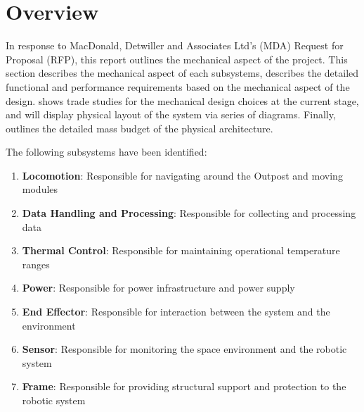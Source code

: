 \documentclass[12pt, letterpaper]{article}
\begin{document}
\cfoot{\normalsize\thepage}
\onehalfspacing
\newpage

\newpage

\newpage

\tableofcontents

\newpage
\listoffigures
\listoftables

\clearpage
\cfoot{\normalsize\thepage}
\section{Overview}
\label{sect:intro}
In response to MacDonald, Detwiller and Associates Ltd's (MDA) Request for Proposal (RFP), this report outlines the mechanical aspect of the project. This section describes the mechanical aspect of each subsystems,  describes the detailed functional and performance requirements based on the mechanical aspect of the design.  shows trade studies for the mechanical design choices at the current stage, and  will display physical layout of the system via series of diagrams. Finally,  outlines the detailed mass budget of the physical architecture.

The following subsystems have been identified:
\vspace{-10pt}
\begin{enumerate}
\item \textbf{Locomotion}: Responsible for navigating around the Outpost and moving modules
\item \textbf{Data Handling and Processing}: Responsible for collecting and processing data
\item \textbf{Thermal Control}: Responsible for maintaining operational temperature ranges
\item \textbf{Power}: Responsible for power infrastructure and power supply
\item \textbf{End Effector}: Responsible for interaction between the system and the environment
\item \textbf{Sensor}: Responsible for monitoring the space environment and the robotic system
\item \textbf{Frame}: Responsible for providing structural support and protection to the robotic system
\end{enumerate}
\end{document}
